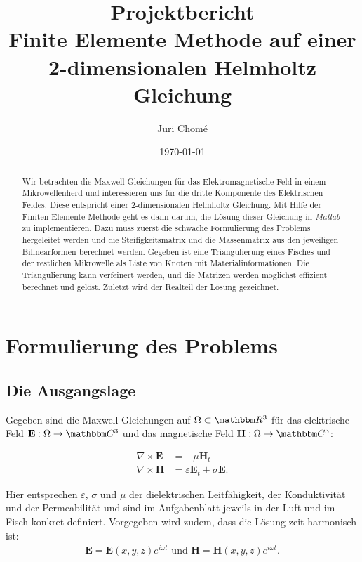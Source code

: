 \documentclass[ngerman,11pt,a4paper,titlepage]{article}
\title{\Huge{Projektbericht}\\
\Large{
Finite Elemente Methode auf einer\\
2-dimensionalen Helmholtz Gleichung}}
\author{Juri Chomé}
\date{\today}
\begin{document}
\maketitle

\begin{abstract}
  Wir betrachten die Maxwell-Gleichungen für das Elektromagnetische Feld in einem Mikrowellenherd und interessieren uns für die dritte Komponente des Elektrischen Feldes. Diese entspricht einer 2-dimensionalen Helmholtz Gleichung. Mit Hilfe der Finiten-Elemente-Methode geht es dann darum, die Lösung dieser Gleichung in \emph{Matlab} zu implementieren. Dazu muss zuerst die schwache Formulierung des Problems hergeleitet werden und die Steifigkeitsmatrix und die Massenmatrix aus den jeweiligen Bilinearformen berechnet werden. Gegeben ist eine Triangulierung eines Fisches und der restlichen Mikrowelle als Liste von Knoten mit Materialinformationen. Die Triangulierung kann verfeinert werden, und die Matrizen werden möglichst effizient berechnet und gelöst. Zuletzt wird der Realteil der Lösung gezeichnet.
\end{abstract}

\section{Formulierung des Problems}
\subsection{Die Ausgangslage}
Gegeben sind die Maxwell-Gleichungen auf $\Omega \subset \mathbbm R^3$ für das elektrische Feld $\mathbf E:\Omega \rightarrow \mathbbm C^3$ und das magnetische Feld $\mathbf H:\Omega \rightarrow \mathbbm C^3$:

\begin{align}
  \nabla \times \mathbf E &= -\mu \mathbf H_t \label{max1} \\
  \nabla \times \mathbf H &= \varepsilon \mathbf E_t + \sigma \mathbf E. \label{max2}
\end{align}

Hier entsprechen $\varepsilon$, $\sigma$ und $\mu$ der dielektrischen Leitfähigkeit, der Konduktivität und der Permeabilität und sind im Aufgabenblatt jeweils in der Luft und im Fisch konkret definiert. Vorgegeben wird zudem, dass die Lösung zeit-harmonisch ist:
\begin{align*}
  \mathbf E = \mathbf E(x,y,z) e^{i\omega t} \text{ und } \mathbf H = \mathbf H(x,y,z) e^{i\omega t}.
\end{align*}
\end{document}
